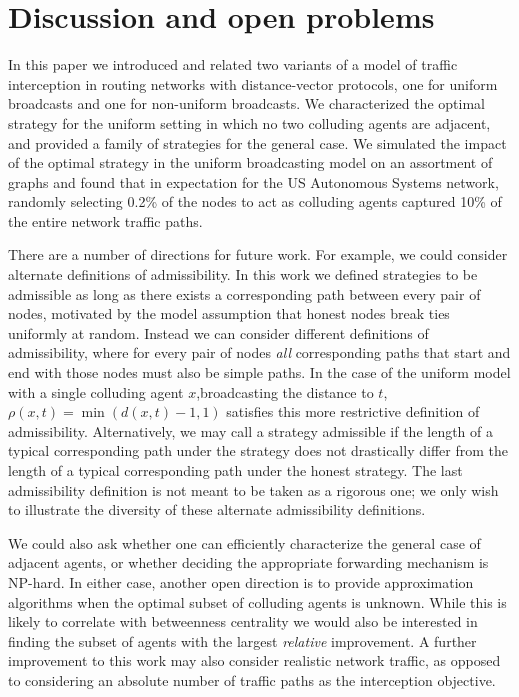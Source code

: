 \documentclass{comnet}
\begin{document}
\section{Discussion and open problems} \label{sec:conclusion}

In this paper we introduced and related two variants of a model of traffic interception in routing networks with distance-vector protocols, one for uniform broadcasts and one for non-uniform
broadcasts. We characterized the optimal strategy for the uniform setting in
which no two colluding agents are adjacent, and provided a family of strategies
for the general case. We simulated the impact of the optimal strategy in the
uniform broadcasting model on an assortment of graphs and found that in
expectation for the US Autonomous Systems network, randomly selecting 0.2\% of
the nodes to act as colluding agents captured 10\% of the entire network
traffic paths.

There are a number of directions for future work.  For example, we could consider alternate
definitions of admissibility.  In this work we defined strategies to be admissible 
as long as there exists a corresponding path between every pair of nodes, motivated by the model assumption
that honest nodes break ties uniformly at random.  Instead we can consider different definitions of admissibility, 
where for every pair of nodes {\em{all} }corresponding paths that start and end with those nodes must also be simple paths.   
In the case of the uniform model with a single colluding agent $x$,broadcasting the distance to $t$, $\rho(x,t)=\min(d(x,t)-1,1)$ 
satisfies this more restrictive definition of admissibility.   Alternatively, we may call a strategy admissible if
the length of a typical corresponding path under the strategy does not drastically differ from the length of a typical corresponding path under the honest strategy.  The last admissibility definition is not meant to be taken as a rigorous one; we only wish to illustrate the diversity of these alternate admissibility definitions.

We could also ask  whether one can efficiently characterize the general case of adjacent agents,
or whether deciding the appropriate forwarding mechanism is NP-hard. In either
case, another open direction is to provide approximation algorithms when the
optimal subset of colluding agents is unknown. While this is likely to correlate with
betweenness centrality we would also be interested in finding the
subset of agents with the largest \emph{relative} improvement. A further
improvement to this work may also consider realistic network traffic, as
opposed to considering an absolute number of traffic paths as the interception
objective.
\end{document}
